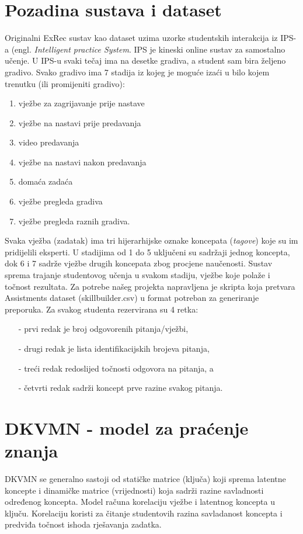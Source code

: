 \section{Pozadina sustava i dataset}
Originalni ExRec sustav kao dataset uzima uzorke studentskih interakcija iz IPS-a (engl. \textit{Intelligent practice System}.
IPS je kineski online sustav za samostalno učenje. U IPS-u svaki tečaj ima na desetke gradiva, a student sam bira željeno gradivo. Svako gradivo ima 7 stadija iz kojeg je moguće izaći u bilo kojem trenutku (ili promijeniti gradivo):
\begin{enumerate}
\item vježbe za zagrijavanje prije nastave
\item vježbe na nastavi prije predavanja
\item video predavanja
\item vježbe na nastavi nakon predavanja
\item domaća zadaća
\item vježbe pregleda gradiva
\item vježbe pregleda raznih gradiva.
\end{enumerate}
Svaka vježba (zadatak) ima tri hijerarhijske oznake koncepata (\textit{tagove}) koje su im pridijelili eksperti. U stadijima od 1 do 5 uključeni su sadržaji jednog koncepta, dok 6 i 7 sadrže vježbe drugih koncepata zbog procjene naučenosti. Sustav sprema trajanje studentovog učenja u svakom stadiju, vježbe koje polaže i točnost rezultata.\newline
\newline
Za potrebe našeg projekta napravljena je skripta koja pretvara Assistments dataset (skillbuilder.csv) u format potreban za generiranje preporuka.\newline
Za svakog studenta rezervirana su 4 retka:
\begin{itemize}
\item[-]prvi redak je broj odgovorenih pitanja/vježbi,
\item[-]drugi redak je lista identifikacijskih brojeva pitanja,
\item[-]treći redak redoslijed točnosti odgovora na pitanja, a
\item[-]četvrti redak sadrži koncept prve razine svakog pitanja.
\end{itemize}
\section{DKVMN - model za praćenje znanja}
DKVMN se generalno sastoji od statičke matrice (ključa) koji sprema latentne koncepte i dinamičke matrice (vrijednosti) koja sadrži razine savladnosti određenog koncepta. Model računa korelaciju vježbe i latentnog koncepta u ključu. Korelaciju koristi za čitanje studentovih razina savladanost koncepta i predviđa točnost ishoda rješavanja zadatka.\newline
